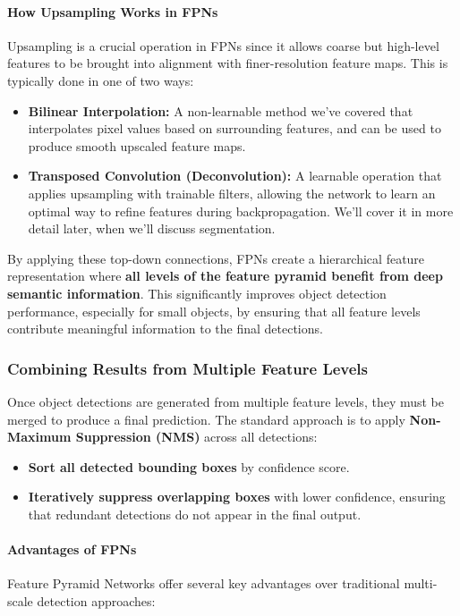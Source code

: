\paragraph{How Upsampling Works in FPNs}
Upsampling is a crucial operation in FPNs since it allows coarse but high-level features to be brought into alignment with finer-resolution feature maps. This is typically done in one of two ways:

\begin{itemize}
    \item \textbf{Bilinear Interpolation:} A non-learnable method we've covered that interpolates pixel values based on surrounding features, and can be used to produce smooth upscaled feature maps.
    \item \textbf{Transposed Convolution (Deconvolution):} A learnable operation that applies upsampling with trainable filters, allowing the network to learn an optimal way to refine features during backpropagation. We'll cover it in more detail later, when we'll discuss segmentation. 
\end{itemize}

By applying these top-down connections, FPNs create a hierarchical feature representation where \textbf{all levels of the feature pyramid benefit from deep semantic information}. This significantly improves object detection performance, especially for small objects, by ensuring that all feature levels contribute meaningful information to the final detections.

\subsubsection{Combining Results from Multiple Feature Levels}
Once object detections are generated from multiple feature levels, they must be merged to produce a final prediction. The standard approach is to apply \textbf{Non-Maximum Suppression (NMS)} across all detections:

\begin{itemize}
    \item \textbf{Sort all detected bounding boxes} by confidence score.
    \item \textbf{Iteratively suppress overlapping boxes} with lower confidence, ensuring that redundant detections do not appear in the final output.
\end{itemize}

\paragraph{Advantages of FPNs}
Feature Pyramid Networks offer several key advantages over traditional multi-scale detection approaches:

